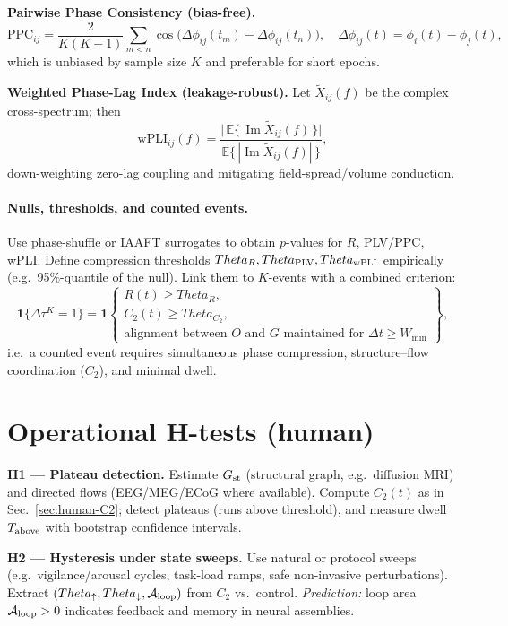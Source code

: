 \documentclass[12pt,a4paper,oneside]{scrreprt}
\def\Theta{Theta}%
\def\;{}%
\begin{document}
\textbf{Pairwise Phase Consistency (bias-free).}
\begin{equation}
\mathrm{PPC}_{ij} \;=\; \frac{2}{K(K-1)} \sum_{m<n} 
\cos\Big( \Delta\phi_{ij}(t_m) - \Delta\phi_{ij}(t_n) \Big),
\quad \Delta\phi_{ij}(t)=\phi_i(t)-\phi_j(t),
\end{equation}
which is unbiased by sample size $K$ and preferable for short epochs.

\textbf{Weighted Phase-Lag Index (leakage-robust).}
Let $\tilde X_{ij}(f)$ be the complex cross-spectrum; then
\begin{equation}
\mathrm{wPLI}_{ij}(f) \;=\;
\frac{\big|\,\mathbb{E}\{\,\operatorname{Im}\tilde X_{ij}(f)\,\}\big|}
     {\mathbb{E}\{\,|\operatorname{Im}\tilde X_{ij}(f)|\,\}},
\end{equation}
down-weighting zero-lag coupling and mitigating field-spread/volume conduction.

\paragraph{Nulls, thresholds, and counted events.}
Use phase-shuffle or IAAFT surrogates to obtain $p$-values for $R$, PLV/PPC, wPLI. 
Define compression thresholds $\Theta_R,\Theta_{\rm PLV},\Theta_{\rm wPLI}$ empirically (e.g.\ 95\%-quantile of the null). 
Link them to $K$-events with a combined criterion:
\[
\mathbf{1}\{\Delta\tau^K=1\} 
\;=\; \mathbf{1}\!\left\{ 
\begin{array}{l}
R(t)\ge \Theta_R, \\
C_2(t)\ge \Theta_{C_2}, \\
\text{alignment between $O$ and $G$ maintained for } \Delta t \ge W_{\min}
\end{array}
\right\},
\]
i.e.\ a counted event requires simultaneous phase compression, structure–flow coordination ($C_2$), and minimal dwell.

\section{Operational H-tests (human)}\label{sec:human-tests}

\textbf{H1 — Plateau detection.} 
Estimate $G_{\rm st}$ (structural graph, e.g.\ diffusion MRI) and directed flows (EEG/MEG/ECoG where available). 
Compute $C_2(t)$ as in Sec.~\ref{sec:human-C2}; detect plateaus (runs above threshold), and measure dwell $T_{\rm above}$ with bootstrap confidence intervals.

\textbf{H2 — Hysteresis under state sweeps.} 
Use natural or protocol sweeps (e.g.\ vigilance/arousal cycles, task-load ramps, safe non-invasive perturbations). 
Extract $(\Theta_\uparrow,\Theta_\downarrow,\mathcal A_{\rm loop})$ from $C_2$ vs.\ control. 
\emph{Prediction:} loop area $\mathcal A_{\rm loop}>0$ indicates feedback and memory in neural assemblies.
\end{document}
